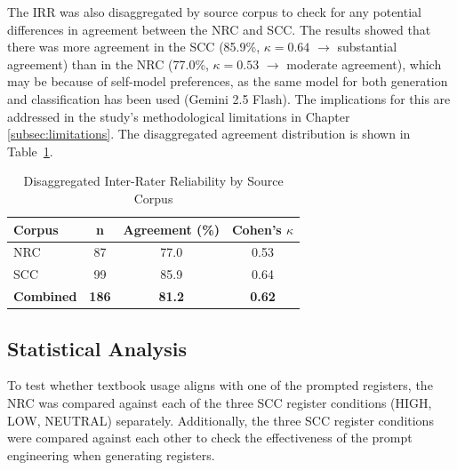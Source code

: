 \documentclass[11pt,a4paper]{article}
\begin{document}
The IRR was also disaggregated by source corpus to check for any potential differences in agreement between the NRC and SCC. The results showed that there was more agreement in the SCC (85.9\%, $\kappa=0.64$ $\to$ substantial agreement) than in the NRC (77.0\%, $\kappa=0.53$ $\to$ moderate agreement), which may be because of self-model preferences, as the same model for both generation and classification has been used (Gemini 2.5 Flash). The implications for this are addressed in the study's methodological limitations in Chapter \ref{subsec:limitations}. The disaggregated agreement distribution is shown in Table~\ref{tab:inter_rater_reliability}.

\vspace{1em}
\begin{table}[H]
\centering
\caption{Disaggregated Inter-Rater Reliability by Source Corpus}
\label{tab:inter_rater_reliability}
\begin{tabular}{lccc}
\toprule
\textbf{Corpus} & \textbf{n} & \textbf{Agreement (\%)} & \textbf{Cohen's $\kappa$} \\
\midrule
NRC & 87 & 77.0 & 0.53 \\
SCC & 99 & 85.9 & 0.64 \\
\midrule
\textbf{Combined} & \textbf{186} & \textbf{81.2} & \textbf{0.62} \\
\bottomrule
\end{tabular}
\end{table}
\vspace{1em}

\subsection{Statistical Analysis}\label{subsec:statistical-analysis}

To test whether textbook usage aligns with one of the prompted registers, the NRC was compared against each of the three SCC register conditions (HIGH, LOW, NEUTRAL) separately. Additionally, the three SCC register conditions were compared against each other to check the effectiveness of the prompt engineering when generating registers. 
\end{document}
